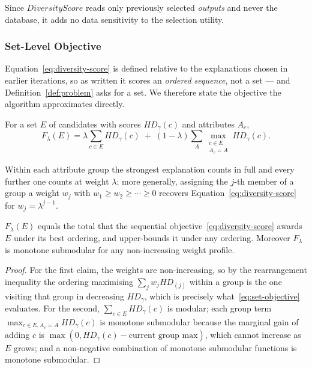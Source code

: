 Since $DiversityScore$ reads only previously selected \emph{outputs} and never the database, it adds no data sensitivity to the selection utility.

\subsubsection{Set-Level Objective}
\label{subsubsec:set-objective}

Equation~\eqref{eq:diversity-score} is defined relative to the explanations chosen in earlier iterations, so as written it scores an \emph{ordered sequence}, not a set --- and Definition~\ref{def:problem} asks for a set.
We therefore state the objective the algorithm approximates directly.

\begin{definition}
\label{def:setobj}
For a set $E$ of candidates with scores $HD_\gamma(c)$ and attributes $A_c$,
\begin{equation}
F_\lambda(E)=\lambda\!\!\sum_{c\in E}\!HD_\gamma(c)
\;+\;(1-\lambda)\!\!\sum_{A}\max_{\substack{c\in E\\ A_c=A}}\!HD_\gamma(c).
\label{eq:set-objective}
\end{equation}
\end{definition}

Within each attribute group the strongest explanation counts in full and every further one counts at weight $\lambda$; more generally, assigning the $j$-th member of a group a weight $w_j$ with $w_1\ge w_2\ge\cdots\ge 0$ recovers Equation~\eqref{eq:diversity-score} for $w_j=\lambda^{j-1}$.

\begin{proposition}
\label{prop:setobj}
$F_\lambda(E)$ equals the total that the sequential objective~\eqref{eq:diversity-score} awards $E$ under its best ordering, and upper-bounds it under any ordering.
Moreover $F_\lambda$ is monotone submodular for any non-increasing weight profile.
\end{proposition}

\begin{proof}
For the first claim, the weights are non-increasing, so by the rearrangement inequality the ordering maximising $\sum_j w_j HD_{(j)}$ within a group is the one visiting that group in decreasing $HD_\gamma$, which is precisely what~\eqref{eq:set-objective} evaluates.
For the second, $\sum_{c\in E}HD_\gamma(c)$ is modular; each group term $\max_{c\in E,A_c=A}HD_\gamma(c)$ is monotone submodular because the marginal gain of adding $c$ is $\max(0,HD_\gamma(c)-\text{current group max})$, which cannot increase as $E$ grows; and a non-negative combination of monotone submodular functions is monotone submodular.
\end{proof}


